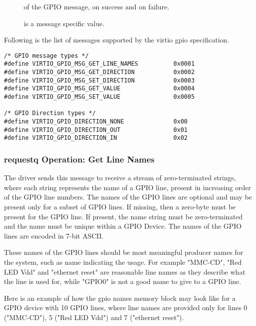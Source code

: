 \begin{description}
\item[] of the GPIO message,
     on success and 
    on failure.

\item[] is a message specific value.
\end{description}

Following is the list of messages supported by the virtio gpio specification.

\begin{lstlisting}
/* GPIO message types */
#define VIRTIO_GPIO_MSG_GET_LINE_NAMES          0x0001
#define VIRTIO_GPIO_MSG_GET_DIRECTION           0x0002
#define VIRTIO_GPIO_MSG_SET_DIRECTION           0x0003
#define VIRTIO_GPIO_MSG_GET_VALUE               0x0004
#define VIRTIO_GPIO_MSG_SET_VALUE               0x0005

/* GPIO Direction types */
#define VIRTIO_GPIO_DIRECTION_NONE              0x00
#define VIRTIO_GPIO_DIRECTION_OUT               0x01
#define VIRTIO_GPIO_DIRECTION_IN                0x02
\end{lstlisting}

\subsubsection{requestq Operation: Get Line Names}\label{sec:Device Types / GPIO Device / requestq Operation / Get Line Names}

The driver sends this message to receive a stream of zero-terminated strings,
where each string represents the name of a GPIO line, present in increasing
order of the GPIO line numbers. The names of the GPIO lines are optional and may
be present only for a subset of GPIO lines. If missing, then a zero-byte must be
present for the GPIO line. If present, the name string must be zero-terminated
and the name must be unique within a GPIO Device. The names of the GPIO lines
are encoded in 7-bit ASCII.

These names of the GPIO lines should be most meaningful producer names for the
system, such as name indicating the usage. For example "MMC-CD", "Red LED Vdd"
and "ethernet reset" are reasonable line names as they describe what the line is
used for, while "GPIO0" is not a good name to give to a GPIO line.

Here is an example of how the gpio names memory block may look like for a GPIO
device with 10 GPIO lines, where line names are provided only for lines 0
("MMC-CD"), 5 ("Red LED Vdd") and 7 ("ethernet reset").

